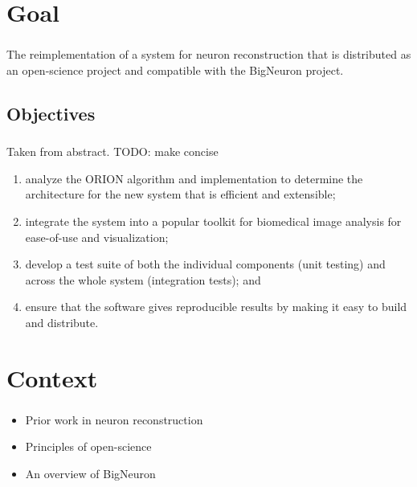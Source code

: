 \documentclass{beamer}
\newcommand{\tbackground}[1]{#1}
\newcommand{\tobjectives}[1]{#1}
\newcommand{\tbackground}[1]{\textcolor{tbackground}{#1}}
\newcommand{\tobjectives}[1]{\textcolor{tobjectives}{#1}}
\begin{document}
\section{Goal}
\begin{frame}\frametitle{\secname}
	\centering
	\tobjectives{
	The reimplementation of  a system
		for \alert{neuron reconstruction}
		that is distributed as an \alert{open-science} project
		and
		compatible with the \alert{BigNeuron} project.
	}
\end{frame}

\subsection{Objectives}
\begin{frame}\frametitle{\subsecname}
	\tobjectives{
	Taken from abstract. TODO: make concise
	\begin{enumerate}
		\item analyze the ORION algorithm and implementation to
			determine the architecture for the new system that is
			efficient and extensible;
		\item integrate the system into a popular toolkit for biomedical
			image analysis for ease-of-use and visualization;
		\item develop a test suite of both the individual components (unit
			testing) and across the whole system (integration tests);
			and %
		\item ensure that the software gives reproducible results by
			making it easy to build and distribute. %
	\end{enumerate}
	}
\end{frame}

\section{Context}
\begin{frame}\frametitle{\secname}
	\tbackground{
	\begin{itemize}
		\item Prior work in \alert{neuron reconstruction}
		\item Principles of \alert{open-science}
		\item An overview of \alert{BigNeuron}
	\end{itemize}
	}
\end{frame}
\end{document}
